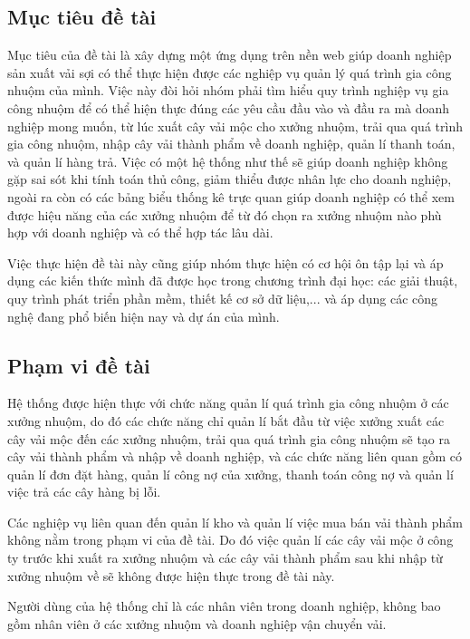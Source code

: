 \subsection{Mục tiêu đề tài}

Mục tiêu của đề tài là xây dựng một ứng dụng trên nền web giúp doanh nghiệp sản xuất vải sợi có thể thực hiện được các nghiệp vụ quản lý quá trình gia công nhuộm của mình. Việc này đòi hỏi nhóm phải tìm hiểu quy trình nghiệp vụ gia công nhuộm để có thể hiện thực đúng các yêu cầu đầu vào và đầu ra mà doanh nghiệp mong muốn, từ lúc xuất cây vải mộc cho xưởng nhuộm, trải qua quá trình gia công nhuộm, nhập cây vải thành phẩm về doanh nghiệp, quản lí thanh toán,  và quản lí hàng trả. Việc có một hệ thống như thế sẽ giúp doanh nghiệp không gặp sai sót khi tính toán thủ công, giảm thiểu được nhân lực cho doanh nghiệp, ngoài ra còn có các bảng biểu thống kê trực quan giúp doanh nghiệp có thể xem được hiệu năng của các xưởng nhuộm để từ đó chọn ra xưởng nhuộm nào phù hợp với doanh nghiệp và có thể hợp tác lâu dài. \par

Việc thực hiện đề tài này cũng giúp nhóm thực hiện có cơ hội ôn tập lại và áp dụng các kiến thức mình đã được học trong chương trình đại học: các giải thuật, quy trình phát triển phần mềm, thiết kế cơ sở dữ liệu,... và áp dụng các công nghệ đang phổ biến hiện nay và dự án của mình. \par

\subsection{Phạm vi đề tài}

Hệ thống được hiện thực với chức năng quản lí quá trình gia công nhuộm ở các xưởng nhuộm, do đó các chức năng chỉ quản lí bắt đầu từ việc xưởng xuất các cây vải mộc đến các xưởng nhuộm, trải qua quá trình gia công nhuộm sẽ tạo ra cây vải thành phẩm và nhập về doanh nghiệp, và các chức năng liên quan gồm có quản lí đơn đặt hàng, quản lí công nợ của xưởng, thanh toán công nợ và quản lí việc trả các cây hàng bị lỗi. \par

Các nghiệp vụ liên quan đến quản lí kho và quản lí việc mua bán vải thành phẩm không nằm trong phạm vi của đề tài. Do đó việc quản lí các cây vải mộc ở công ty trước khi xuất ra xưởng nhuộm và các cây vải thành phẩm sau khi nhập từ xưởng nhuộm về sẽ không được hiện thực trong đề tài này. \par

Người dùng của hệ thống chỉ là các nhân viên trong doanh nghiệp, không bao gồm nhân viên ở các xưởng nhuộm và doanh nghiệp vận chuyển vải. \par